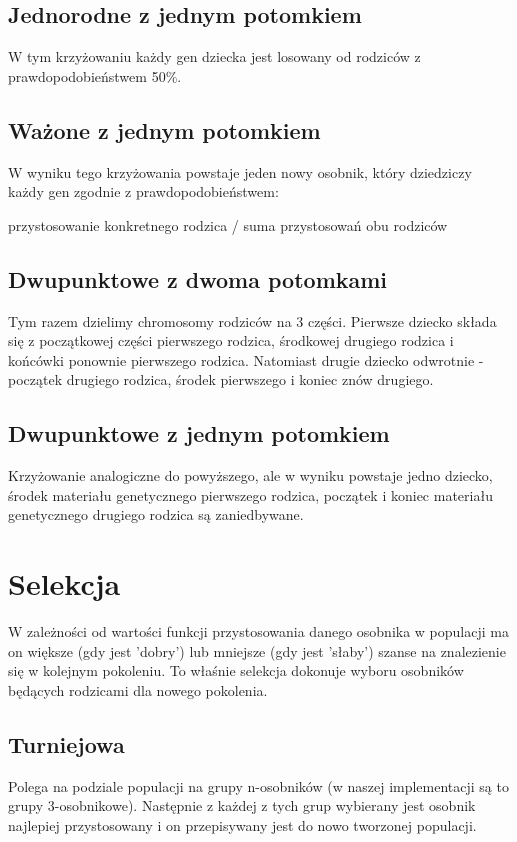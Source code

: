 \documentclass[11pt]{aghdpl}
\begin{document}
\section{Jednorodne z jednym potomkiem}
\label{sec:uniform}
W tym krzyżowaniu każdy gen dziecka jest losowany od rodziców z prawdopodobieństwem 50\%.

\section{Ważone z jednym potomkiem}
\label{sec:wazone}
W wyniku tego krzyżowania powstaje jeden nowy osobnik, który dziedziczy każdy gen zgodnie z prawdopodobieństwem:
\begin{center}
przystosowanie konkretnego rodzica / suma przystosowań obu rodziców
\end{center}

\section{Dwupunktowe z dwoma potomkami}
\label{sec:dwaDwa}
Tym razem dzielimy chromosomy rodziców na 3 części. Pierwsze dziecko składa się z początkowej części pierwszego rodzica, środkowej drugiego rodzica i końcówki ponownie pierwszego rodzica. Natomiast drugie dziecko odwrotnie - początek drugiego rodzica, środek pierwszego i koniec znów drugiego.

\section{Dwupunktowe z jednym potomkiem}
\label{sec:dwaJeden}
Krzyżowanie analogiczne do powyższego, ale w wyniku powstaje jedno dziecko, środek materiału genetycznego pierwszego rodzica, początek i koniec materiału genetycznego drugiego rodzica są zaniedbywane.

\chapter{Selekcja}
\label{cha:selection}
W zależności od wartości funkcji przystosowania danego osobnika w populacji ma on większe (gdy jest 'dobry') lub mniejsze (gdy jest 'słaby') szanse na znalezienie się w kolejnym pokoleniu. To właśnie selekcja dokonuje wyboru osobników będących rodzicami dla nowego pokolenia.
\section{Turniejowa}
\label{sec:tournament}
Polega na podziale populacji na grupy n-osobników (w naszej implementacji są to grupy 3-osobnikowe). Następnie z każdej z tych grup wybierany jest osobnik najlepiej przystosowany i on przepisywany jest do nowo tworzonej populacji.
\end{document}
